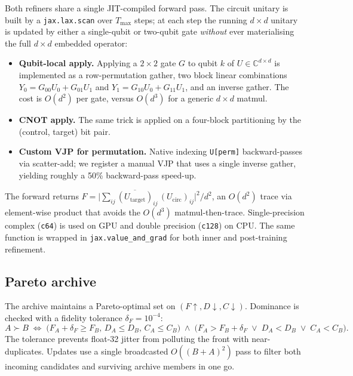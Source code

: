 \documentclass[11pt,a4paper]{article}
\newcommand{\Utarget}{U_{\text{target}}}
\newcommand{\Ucirc}{U_{\text{circ}}}
\newcommand{\Complex}{\mathbb{C}}
\begin{document}
Both refiners share a single JIT-compiled forward pass. The circuit unitary is built by a \texttt{jax.lax.scan} over $T_{\max}$ steps; at each step the running $d \times d$ unitary is updated by either a single-qubit or two-qubit gate \emph{without} ever materialising the full $d\!\times\!d$ embedded operator:
\begin{itemize}[leftmargin=2em]
  \item \textbf{Qubit-local apply.} Applying a $2\times 2$ gate $G$ to qubit $k$ of $U \in \Complex^{d\times d}$ is implemented as a row-permutation gather, two block linear combinations $Y_0 = G_{00}U_0 + G_{01}U_1$ and $Y_1 = G_{10}U_0 + G_{11}U_1$, and an inverse gather. The cost is $O(d^2)$ per gate, versus $O(d^3)$ for a generic $d\!\times\!d$ matmul.
  \item \textbf{CNOT apply.} The same trick is applied on a four-block partitioning by the (control, target) bit pair.
  \item \textbf{Custom VJP for permutation.} Native indexing \texttt{U[perm]} backward-passes via scatter-add; we register a manual VJP that uses a single inverse gather, yielding roughly a 50\% backward-pass speed-up.
\end{itemize}
The forward returns $F = \bigl|\sum_{ij} \overline{(\Utarget)}_{ij}\,(\Ucirc)_{ij}\bigr|^2 / d^2$, an $O(d^2)$ trace via element-wise product that avoids the $O(d^3)$ matmul-then-trace. Single-precision complex (\texttt{c64}) is used on GPU and double precision (\texttt{c128}) on CPU. The same function is wrapped in \texttt{jax.value\_and\_grad} for both inner and post-training refinement.

\subsection{Pareto archive}
\label{sec:pareto}

The archive maintains a Pareto-optimal set on $(F\!\uparrow, D\!\downarrow, C\!\downarrow)$. Dominance is checked with a fidelity tolerance $\delta_F = 10^{-4}$:
\begin{equation}
A \succ B
\;\Longleftrightarrow\;
\bigl(F_A + \delta_F \ge F_B,\, D_A \le D_B,\, C_A \le C_B\bigr)
\;\wedge\;
\bigl(F_A > F_B + \delta_F \;\vee\; D_A < D_B \;\vee\; C_A < C_B\bigr).
\end{equation}
The tolerance prevents float-32 jitter from polluting the front with near-duplicates. Updates use a single broadcasted $O((B+A)^2)$ pass to filter both incoming candidates and surviving archive members in one go.
\end{document}
